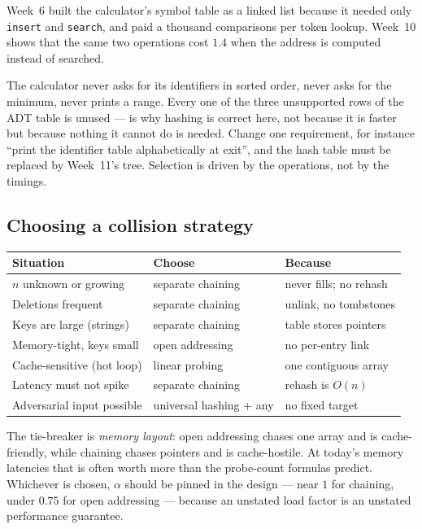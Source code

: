 \documentclass[11pt]{article}
\begin{document}
Week~6 built the calculator's symbol table as a linked list because it needed only \texttt{insert} and \texttt{search}, and paid a thousand comparisons per token lookup. Week~10 shows that the same two operations cost $1.4$ when the address is computed instead of searched.

The calculator never asks for its identifiers in sorted order, never asks for the minimum, never prints a range. Every one of the three unsupported rows of the ADT table is unused ---  is why hashing is correct here, not because it is faster but because nothing it cannot do is needed. Change one requirement, for instance ``print the identifier table alphabetically at exit'', and the hash table must be replaced by Week~11's tree. Selection is driven by the operations, not by the timings.

\subsection{Choosing a collision strategy}

\begin{center}
{\footnotesize
\begin{tabular}{p{3.9cm}p{5.2cm}p{5.2cm}}
  \toprule
  Situation & Choose & Because \\
  \midrule
  $n$ unknown or growing & separate chaining & never fills; no rehash \\
  Deletions frequent & separate chaining & unlink, no tombstones \\
  Keys are large (strings) & separate chaining & table stores pointers \\
  Memory-tight, keys small & open addressing & no per-entry link \\
  Cache-sensitive (hot loop) & linear probing & one contiguous array \\
  Latency must not spike & separate chaining & rehash is $O(n)$ \\
  Adversarial input possible & universal hashing + any & no fixed target \\
  \bottomrule
\end{tabular}}
\end{center}

The tie-breaker is \emph{memory layout}: open addressing chases one array and is cache-friendly, while chaining chases pointers and is cache-hostile. At today's memory latencies that is often worth more than the probe-count formulas predict. Whichever is chosen, $\alpha$ should be pinned in the design --- near $1$ for chaining, under $0.75$ for open addressing --- because an unstated load factor is an unstated performance guarantee.
\end{document}
